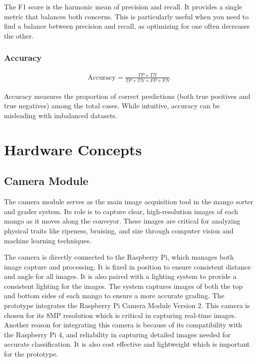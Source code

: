 The F1 score is the harmonic mean of precision and recall. It provides a single metric that balances 
both concerns. This is particularly useful when you need to 
find a balance between precision and recall, as optimizing for one often decreases the other.

\subsubsection{Accuracy}
\begin{eqnarray}
	\text{Accuracy} = \frac{TP + TN}{TP + TN + FP + FN}
	\label{eq:accuracy}
\end{eqnarray}

Accuracy measures the proportion of correct predictions (both true positives and true negatives)
 among the total cases. While intuitive, accuracy can be misleading with imbalanced datasets.

\section{Hardware Concepts}

\subsection{Camera Module} 

The camera module serves as the main image acquisition tool in the mango sorter
and grader system. Its role is to capture clear, high-resolution images of each
mango as it moves along the conveyor. These images are critical for analyzing
physical traits like ripeness, bruising, and size through computer vision and
machine learning techniques.

The camera is directly connected to the Raspberry Pi, which manages both image
capture and processing. It is fixed in position to ensure consistent distance
and angle for all images. It is also paired with a lighting system to provide a
consistent lighting for the images. The system captures images of both the top
and bottom sides of each mango to ensure a more accurate grading. The prototype
integrates the Raspberry Pi Camera Module Version 2. This camera is chosen for
its 8MP resolution which is critical in capturing real-time images. Another
reason for integrating this camera is because of its compatibility with the
Raspberry Pi 4, and reliability in capturing detailed images needed for accurate
classification. It is also cost effective and lightweight which is important for
the prototype.


